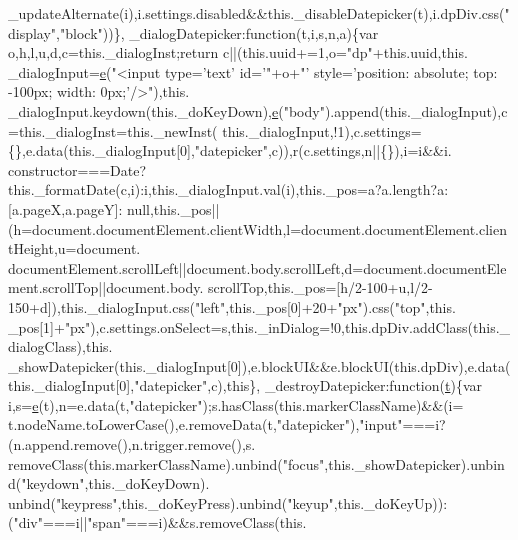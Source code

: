 \begin{DoxyCode}
      \_updateAlternate(i),i.settings.disabled&&this.\_disableDatepicker(t),i.dpDiv.css(\textcolor{stringliteral}{"display"},\textcolor{stringliteral}{"block"}))\},
      \_dialogDatepicker:\textcolor{keyword}{function}(t,i,s,n,a)\{var o,h,l,u,d,c=this.\_dialogInst;\textcolor{keywordflow}{return} c||(this.uuid+=1,o=\textcolor{stringliteral}{"dp"}+this.uuid,this.
      \_dialogInput=\hyperlink{jquery-ui_8min_8js_a2c038346d47955cbe2cb91e338edd7e1}{e}(\textcolor{stringliteral}{"<input type='text' id='"}+o+\textcolor{stringliteral}{"' style='position: absolute; top: -100px; width: 0px;'/>"}),this.
      \_dialogInput.keydown(this.\_doKeyDown),\hyperlink{jquery-ui_8min_8js_a2c038346d47955cbe2cb91e338edd7e1}{e}(\textcolor{stringliteral}{"body"}).append(this.\_dialogInput),c=this.\_dialogInst=this.\_newInst(
      this.\_dialogInput,!1),c.settings=\{\},e.data(this.\_dialogInput[0],\textcolor{stringliteral}{"datepicker"},c)),r(c.settings,n||\{\}),i=i&&i.
      constructor===Date?\textcolor{keyword}{this}.\_formatDate(c,i):i,this.\_dialogInput.val(i),this.\_pos=a?a.length?a:[a.pageX,a.pageY]:
      null,this.\_pos||(h=document.documentElement.clientWidth,l=document.documentElement.clientHeight,u=document.
      documentElement.scrollLeft||document.body.scrollLeft,d=document.documentElement.scrollTop||document.body.
      scrollTop,this.\_pos=[h/2-100+u,l/2-150+d]),this.\_dialogInput.css(\textcolor{stringliteral}{"left"},\textcolor{keyword}{this}.\_pos[0]+20+\textcolor{stringliteral}{"px"}).css(\textcolor{stringliteral}{"top"},this.
      \_pos[1]+\textcolor{stringliteral}{"px"}),c.settings.onSelect=s,this.\_inDialog=!0,this.dpDiv.addClass(this.\_dialogClass),this.
      \_showDatepicker(this.\_dialogInput[0]),e.blockUI&&e.blockUI(this.dpDiv),e.data(this.\_dialogInput[0],\textcolor{stringliteral}{"datepicker"},c),\textcolor{keyword}{this}\},
      \_destroyDatepicker:\textcolor{keyword}{function}(\hyperlink{jquery-2_80_83_8min_8js_aaccc9105df5383111407fd5b41255e23}{t})\{var i,s=\hyperlink{jquery-ui_8min_8js_a2c038346d47955cbe2cb91e338edd7e1}{e}(t),n=e.data(t,\textcolor{stringliteral}{"datepicker"});s.hasClass(this.markerClassName)&&(i=
      t.nodeName.toLowerCase(),e.removeData(t,\textcolor{stringliteral}{"datepicker"}),\textcolor{stringliteral}{"input"}===i?(n.append.remove(),n.trigger.remove(),s.
      removeClass(this.markerClassName).unbind(\textcolor{stringliteral}{"focus"},this.\_showDatepicker).unbind(\textcolor{stringliteral}{"keydown"},this.\_doKeyDown).
      unbind(\textcolor{stringliteral}{"keypress"},this.\_doKeyPress).unbind(\textcolor{stringliteral}{"keyup"},this.\_doKeyUp)):(\textcolor{stringliteral}{"div"}===i||\textcolor{stringliteral}{"span"}===i)&&s.removeClass(this.

\end{DoxyCode}
